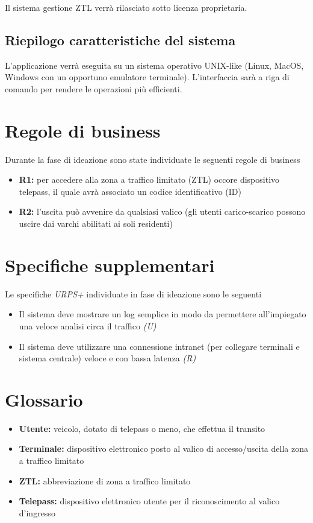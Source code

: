 \documentclass[12pt, letterpaper]{article}
\begin{document}
Il sistema gestione ZTL verrà rilasciato sotto licenza proprietaria.

\subsection{Riepilogo caratteristiche del sistema}
L'applicazione verrà eseguita su un sistema operativo UNIX-like (Linux, MacOS, Windows con un opportuno emulatore terminale). L'interfaccia sarà a riga di comando per rendere le operazioni più efficienti.

\section{Regole di business}
Durante la fase di ideazione sono state individuate le seguenti regole di business
\begin{itemize}
    \item \textbf{R1:} per accedere alla zona 
    a traffico limitato (ZTL) occore dispositivo 
    telepass, il quale avrà associato un codice 
    identificativo (ID)
    \item \textbf{R2:} l'uscita può avvenire da
    qualsiasi valico (gli utenti carico-scarico
    possono uscire dai varchi abilitati ai soli
    residenti)
\end{itemize}

\section{Specifiche supplementari}
Le specifiche \emph{URPS+} individuate in fase di 
ideazione sono le seguenti
\begin{itemize}
    \item Il sistema deve mostrare un log semplice 
    in modo da permettere all'impiegato una veloce 
    analisi circa il traffico \emph{(U)}
    \item Il sistema deve utilizzare una connessione
    intranet (per collegare terminali e sistema centrale)
    veloce e con bassa latenza \emph{(R)}
\end{itemize}

\section{Glossario}
\begin{itemize}
    \item \textbf{Utente:} veicolo, dotato di telepass o meno,
    che effettua il transito
    \item \textbf{Terminale:} dispositivo elettronico posto al 
    valico di accesso/uscita della zona a traffico limitato
    \item \textbf{ZTL:} abbreviazione di zona a traffico limitato
    \item \textbf{Telepass:} dispositivo elettronico utente per 
    il riconoscimento al valico d'ingresso
\end{itemize}
\end{document}

